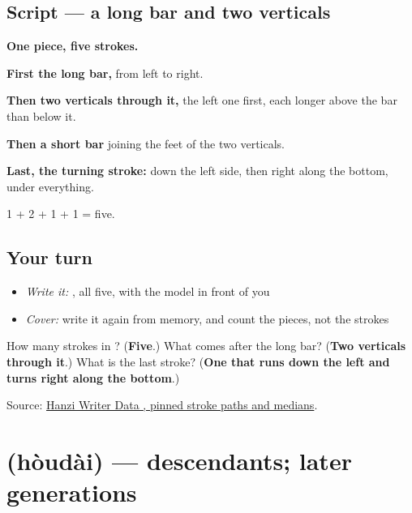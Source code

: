 \subsection*{Script — a long bar and two verticals}

\begin{quote}
\end{quote}

\textbf{One piece, five strokes.}

\textbf{First the long bar,} from left to right.

\textbf{Then two verticals through it,} the left one first, each longer above the bar than below it.

\textbf{Then a short bar} joining the feet of the two verticals.

\textbf{Last, the turning stroke:} down the left side, then right along the bottom, under everything.

1 + 2 + 1 + 1 = five.

\subsection*{Your turn}
\begin{itemize}
\raggedright
  \item \emph{Write it:} , all five, with the model in front of you
  \item \emph{Cover:} write it again from memory, and count the pieces, not the strokes
\end{itemize}

\begin{tcolorbox}[breakable,colback=teal!4,colframe=teal!35!black,title={Before you move on}]
How many strokes in ? (\textbf{Five}.) What comes after the long bar? (\textbf{Two verticals through it}.) What is the last stroke? (\textbf{One that runs down the left and turns right along the bottom}.)

Source: \href{https://raw.githubusercontent.com/chanind/hanzi-writer-data/68d10a4b21150cae5e1ebbd223eed289cf32d90c/data/\%E4\%B8\%96.json}{Hanzi Writer Data , pinned stroke paths and medians}.
\end{tcolorbox}
\section[\texorpdfstring{\zh{后代} (hòudài)}{后代 (hòudài)}]{ (hòudài) — descendants; later generations}

